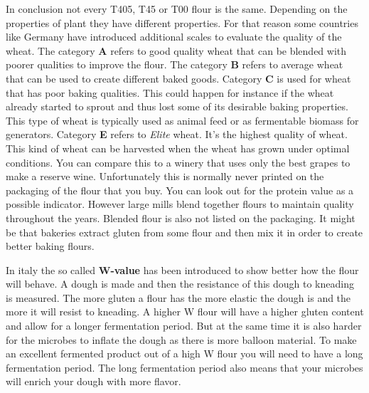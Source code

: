 In conclusion not every T405, T45 or T00 flour is the same. Depending on the properties
of plant they have different properties. For that reason some countries like
Germany have introduced additional scales to evaluate the quality of the
wheat. The category \textbf{A} refers to good quality wheat that can be blended
with poorer qualities to improve the flour. The category \textbf{B} refers to
average wheat that can be used to create different baked goods. Category \textbf{C}
is used for wheat that has poor baking qualities. This could happen for instance
if the wheat already started to sprout and thus lost some of its desirable
baking properties. This type of wheat is typically used as animal feed or
as fermentable biomass for generators. Category \textbf{E} refers to \textit{Elite} wheat. It's
the highest quality of wheat. This kind of wheat can be harvested when the
wheat has grown under optimal conditions. You can compare this to a winery
that uses only the best grapes to make a reserve wine. Unfortunately this is normally never printed
on the packaging of the flour that you buy. You can look out for the protein
value as a possible indicator. However large mills blend together flours to
maintain quality throughout the years. Blended flour is also not listed on
the packaging. It might be that bakeries extract gluten from some flour and
then mix it in order to create better baking flours.

In italy the so called
\textbf{W-value} has been introduced to show better how the flour will behave.
A dough is made and then the resistance of this dough to kneading is measured.
The more gluten a flour has the more elastic the dough is and the more it will
resist to kneading. A higher W flour will have a higher gluten content and allow for a longer
fermentation period. But at the same time it is also harder for the microbes to
inflate the dough as there is more balloon material. To make an excellent fermented
product out of a high W flour you will need to have a long fermentation period.
The long fermentation period also means that your microbes will enrich
your dough with more flavor.

